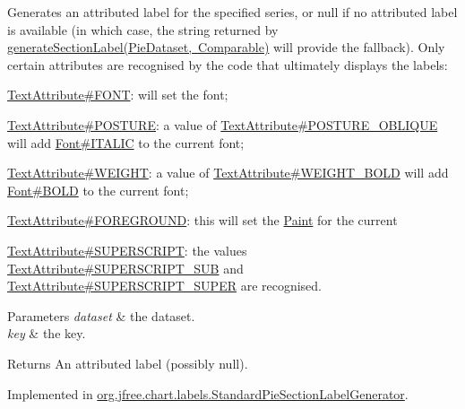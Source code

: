 Generates an attributed label for the specified series, or {\ttfamily null} if no attributed label is available (in which case, the string returned by \mbox{\hyperlink{interfaceorg_1_1jfree_1_1chart_1_1labels_1_1_pie_section_label_generator_a9c514ffcd269a3d73720c1ed588c624f}{generate\+Section\+Label(\+Pie\+Dataset, Comparable)}} will provide the fallback). Only certain attributes are recognised by the code that ultimately displays the labels\+: 
\begin{DoxyItemize}
\item \mbox{\hyperlink{}{Text\+Attribute\#\+F\+O\+NT}}\+: will set the font; 
\item \mbox{\hyperlink{}{Text\+Attribute\#\+P\+O\+S\+T\+U\+RE}}\+: a value of \mbox{\hyperlink{}{Text\+Attribute\#\+P\+O\+S\+T\+U\+R\+E\+\_\+\+O\+B\+L\+I\+Q\+UE}} will add \mbox{\hyperlink{}{Font\#\+I\+T\+A\+L\+IC}} to the current font; 
\item \mbox{\hyperlink{}{Text\+Attribute\#\+W\+E\+I\+G\+HT}}\+: a value of \mbox{\hyperlink{}{Text\+Attribute\#\+W\+E\+I\+G\+H\+T\+\_\+\+B\+O\+LD}} will add \mbox{\hyperlink{}{Font\#\+B\+O\+LD}} to the current font; 
\item \mbox{\hyperlink{}{Text\+Attribute\#\+F\+O\+R\+E\+G\+R\+O\+U\+ND}}\+: this will set the \mbox{\hyperlink{}{Paint}} for the current 
\item \mbox{\hyperlink{}{Text\+Attribute\#\+S\+U\+P\+E\+R\+S\+C\+R\+I\+PT}}\+: the values \mbox{\hyperlink{}{Text\+Attribute\#\+S\+U\+P\+E\+R\+S\+C\+R\+I\+P\+T\+\_\+\+S\+UB}} and \mbox{\hyperlink{}{Text\+Attribute\#\+S\+U\+P\+E\+R\+S\+C\+R\+I\+P\+T\+\_\+\+S\+U\+P\+ER}} are recognised. 
\end{DoxyItemize}


\begin{DoxyParams}{Parameters}
{\em dataset} & the dataset. \\
\hline
{\em key} & the key.\\
\hline
\end{DoxyParams}
\begin{DoxyReturn}{Returns}
An attributed label (possibly {\ttfamily null}). 
\end{DoxyReturn}


Implemented in \mbox{\hyperlink{classorg_1_1jfree_1_1chart_1_1labels_1_1_standard_pie_section_label_generator_a77c817699c799f3112e7ed696bae25d5}{org.\+jfree.\+chart.\+labels.\+Standard\+Pie\+Section\+Label\+Generator}}.

\mbox{\label{interfaceorg_1_1jfree_1_1chart_1_1labels_1_1_pie_section_label_generator_a9c514ffcd269a3d73720c1ed588c624f}} 
